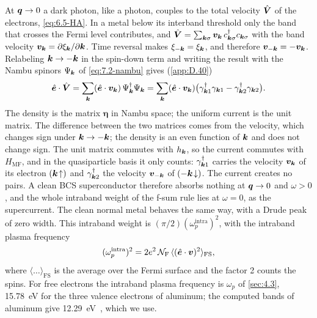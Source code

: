 At $\bm{q} \to 0$ a dark photon, like a photon, couples to the total velocity $\hat{\bm{V}}$ of the electrons, \cref{eq:6.5-HA}. In a metal below its interband threshold only the band that crosses the Fermi level contributes, and $\hat{\bm{V}} = \sum_{\bm{k}\sigma}\bm{v}_{\bm{k}}\,c^\dagger_{\bm{k}\sigma}c_{\bm{k}\sigma}$ with the band velocity $\bm{v}_{\bm{k}} = \partial\xi_{\bm{k}}/\partial\bm{k}$. Time reversal makes $\xi_{-\bm{k}} = \xi_{\bm{k}}$, and therefore $\bm{v}_{-\bm{k}} = -\bm{v}_{\bm{k}}$. Relabeling $\bm{k} \to -\bm{k}$ in the spin-down term and writing the result with the Nambu spinors $\Psi_{\bm{k}}$ of \cref{eq:7.2-nambu} gives (\cref{app:D.40})
\begin{equation}
  \hat{\bm{e}}\cdot\hat{\bm{V}} = \sum_{\bm{k}}(\hat{\bm{e}}\cdot\bm{v}_{\bm{k}})\,\Psi^\dagger_{\bm{k}}\Psi_{\bm{k}}
  = \sum_{\bm{k}}(\hat{\bm{e}}\cdot\bm{v}_{\bm{k}})\bigl(\gamma^\dagger_{\bm{k}1}\gamma_{\bm{k}1} - \gamma^\dagger_{\bm{k}2}\gamma_{\bm{k}2}\bigr) .
  \label{eq:15.4-Vnambu}
\end{equation}
The density is the matrix $\boldsymbol{\eta}$ in Nambu space; the uniform current is the unit matrix. The difference between the two matrices comes from the velocity, which changes sign under $\bm{k} \to -\bm{k}$; the density is an even function of $\bm{k}$ and does not change sign. The unit matrix commutes with $h_{\bm{k}}$, so the current commutes with $H_{\mathrm{MF}}$, and in the quasiparticle basis it only counts: $\gamma^\dagger_{\bm{k}1}$ carries the velocity $\bm{v}_{\bm{k}}$ of its electron $(\bm{k}\!\uparrow)$ and $\gamma^\dagger_{\bm{k}2}$ the velocity $\bm{v}_{-\bm{k}}$ of $(-\bm{k}\!\downarrow)$. The current creates no pairs. A clean BCS superconductor therefore absorbs nothing at $\bm{q} \to 0$ and $\omega > 0$, and the whole intraband weight of the f-sum rule lies at $\omega = 0$, as the supercurrent. The clean normal metal behaves the same way, with a Drude peak of zero width. This intraband weight is $(\pi/2)(\omega_p^{\mathrm{intra}})^2$, with the intraband plasma frequency
\begin{equation}
  (\omega_p^{\mathrm{intra}})^2 = 2e^2\,\mathcal{N}_{\mathrm{F}}\,\langle(\hat{\bm{e}}\cdot\bm{v})^2\rangle_{\mathrm{FS}} ,
  \label{eq:15.4-wp}
\end{equation}
where $\langle\dots\rangle_{\mathrm{FS}}$ is the average over the Fermi surface and the factor 2 counts the spins. For free electrons the intraband plasma frequency is $\omega_p$ of \cref{sec:4.3}, \SI{15.78}{eV} for the three valence electrons of aluminum; the computed bands of aluminum give \SI{12.29}{eV}~\cite[Table~IV]{savrasov1996electron}, which we use.


